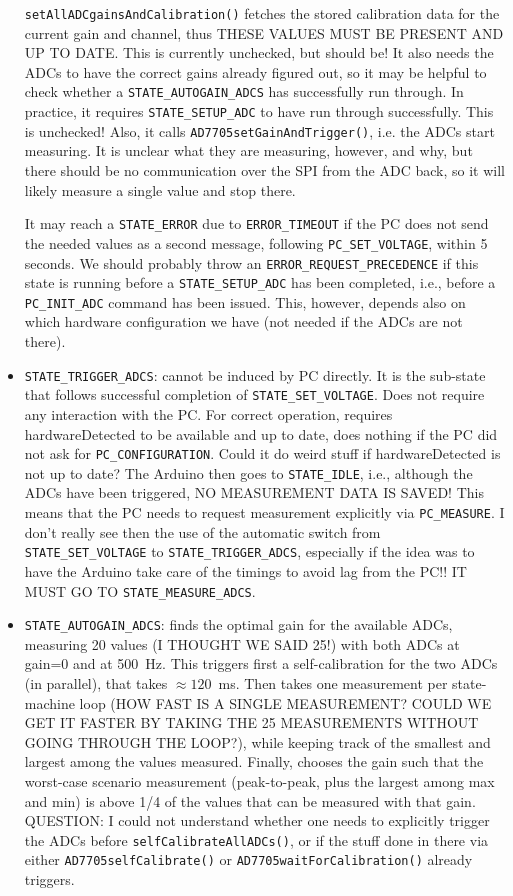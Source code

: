 \documentclass[11pt,a4paper,english]{article}
\begin{document}
\begin{itemize}
	\texttt{setAllADCgainsAndCalibration()} fetches the stored calibration data for the current gain and channel, thus THESE VALUES MUST BE PRESENT AND UP TO DATE. This is currently unchecked, but should be! It also needs the ADCs to have the correct gains already figured out, so it may be helpful to check whether a \texttt{STATE\_AUTOGAIN\_ADCS} has successfully run through. In practice, it requires \texttt{STATE\_SETUP\_ADC} to have run through successfully. This is unchecked! Also, it calls \texttt{AD7705setGainAndTrigger()}, i.e. the ADCs start measuring. It is unclear what they are measuring, however, and why, but there should be no communication over the SPI from the ADC back, so it will likely measure a single value and stop there.

	It may reach a \texttt{STATE\_ERROR} due to \texttt{ERROR\_TIMEOUT} if the PC does not send the needed values as a second message, following \texttt{PC\_SET\_VOLTAGE}, within 5 seconds. We should probably throw an \texttt{ERROR\_REQUEST\_PRECEDENCE} if this state is running before a \texttt{STATE\_SETUP\_ADC} has been completed, i.e., before a \texttt{PC\_INIT\_ADC} command has been issued. This, however, depends also on which hardware configuration we have (not needed if the ADCs are not there).

\item \texttt{STATE\_TRIGGER\_ADCS}: cannot be induced by PC directly. It is the sub-state that follows successful completion of \texttt{STATE\_SET\_VOLTAGE}. Does not require any interaction with the PC. For correct operation, requires hardwareDetected to be available and up to date, does nothing if the PC did not ask for \texttt{PC\_CONFIGURATION}. Could it do weird stuff if hardwareDetected is not up to date? The Arduino then goes to \texttt{STATE\_IDLE}, i.e., although the ADCs have been triggered, NO MEASUREMENT DATA IS SAVED! This means that the PC needs to request measurement explicitly via \texttt{PC\_MEASURE}. I don't really see then the use of the automatic switch from \texttt{STATE\_SET\_VOLTAGE} to \texttt{STATE\_TRIGGER\_ADCS}, especially if the idea was to have the Arduino take care of the timings to avoid lag from the PC!! IT MUST GO TO \texttt{STATE\_MEASURE\_ADCS}.

\item \texttt{STATE\_AUTOGAIN\_ADCS}: finds the optimal gain for the available ADCs, measuring 20 values (I THOUGHT WE SAID 25!) with both ADCs at gain=0 and at 500~Hz. This triggers first a self-calibration for the two ADCs (in parallel), that takes $\approx120$~ms. Then takes one measurement per state-machine loop (HOW FAST IS A SINGLE MEASUREMENT? COULD WE GET IT FASTER BY TAKING THE 25 MEASUREMENTS WITHOUT GOING THROUGH THE LOOP?), while keeping track of the smallest and largest among the values measured. Finally, chooses the gain such that the worst-case scenario measurement (peak-to-peak, plus the largest among max and min) is above 1/4 of the values that can be measured with that gain. QUESTION: I could not understand whether one needs to explicitly trigger the ADCs before \texttt{selfCalibrateAllADCs()}, or if the stuff done in there via either \texttt{AD7705selfCalibrate()} or \texttt{AD7705waitForCalibration()} already triggers.


\end{itemize}
\end{document}
